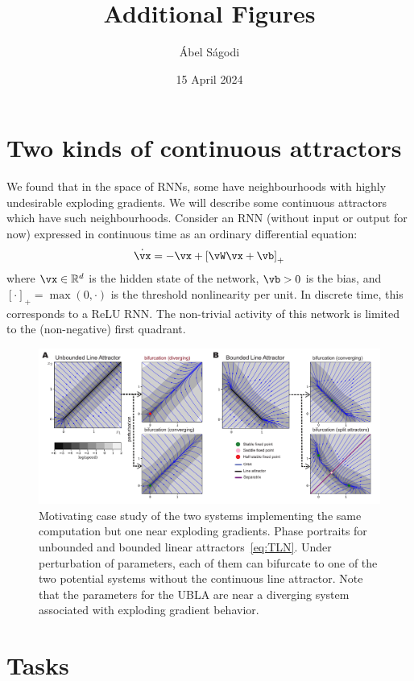 \documentclass{article}
\title{Additional Figures}
\author{\'Abel S\'agodi}
\date{15 April 2024}
\newcommand{\reals}{\mathbb{R}}
\newcounter{ct}
\theoremstyle{definition}
\theoremstyle{remark}
\begin{document}

\maketitle

\section{Two kinds of continuous attractors}
We found that in the space of RNNs, some have neighbourhoods with highly undesirable exploding gradients. We will describe some continuous attractors which have such neighbourhoods.
Consider an RNN (without input or output for now) expressed in continuous time as an ordinary differential equation:
\begin{align}\label{eq:TLN}
    \dot{\vx} = -\vx + \left[ \vW \vx + \vb \right]_{+}
\end{align}
where $\vx \in \reals^d$ is the hidden state of the network, $\vb > 0$ is the bias, and $[\cdot]_{+} = \max(0,\cdot)$ is the threshold nonlinearity per unit.
In discrete time, this corresponds to a ReLU RNN.
The non-trivial activity of this network is limited to the (non-negative) first quadrant.
\begin{figure}[tbhp]
  \centering
  \includegraphics[width=\textwidth]{UBLABLA}
  \caption{Motivating case study of the two systems implementing the same computation but one near exploding gradients.
    Phase portraits for unbounded and bounded linear attractors~\eqref{eq:TLN}.
    Under perturbation of parameters, each of them can bifurcate to one of the two potential systems without the continuous line attractor.
    Note that the parameters for the UBLA are near a diverging system associated with exploding gradient behavior.
}
  \label{fig:ublabla}
\end{figure}


\newpage
\section{Tasks}
\end{document}
